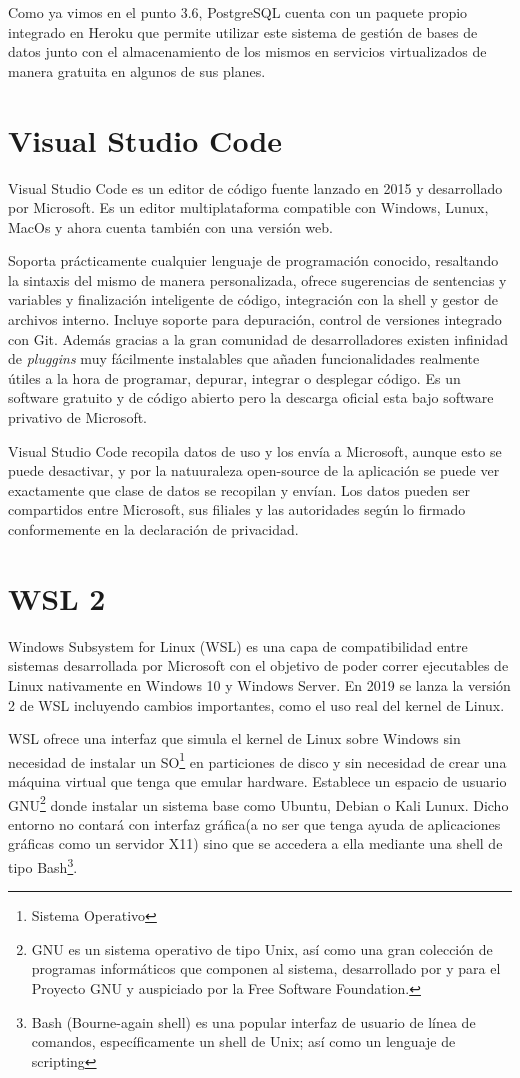 \documentclass[a4paper, 12pt]{book}
\begin{document}
Como ya vimos en el punto 3.6, PostgreSQL cuenta con un paquete propio integrado en Heroku que permite utilizar este sistema de gestión de bases de datos junto con el almacenamiento de los mismos en servicios virtualizados de manera gratuita en algunos de sus planes.  

\section{Visual Studio Code}
Visual Studio Code es un editor de código fuente lanzado en 2015 y desarrollado por Microsoft. Es un editor multiplataforma compatible con Windows, Lunux, MacOs y ahora cuenta también con una versión web. 

Soporta prácticamente cualquier lenguaje de programación conocido, resaltando la sintaxis del mismo de manera personalizada, ofrece sugerencias de sentencias y variables y finalización inteligente de código, integración con la shell y gestor de archivos interno. Incluye soporte para depuración, control de versiones integrado con Git. Además gracias a la gran comunidad de desarrolladores existen infinidad de \emph{pluggins} muy fácilmente instalables que añaden funcionalidades realmente útiles a la hora de programar, depurar, integrar o desplegar código. 
Es un software gratuito y de código abierto pero la descarga oficial esta bajo software privativo de Microsoft. 

Visual Studio Code recopila datos de uso y los envía a Microsoft, aunque esto se puede desactivar, y por la natuuraleza open-source de la aplicación se puede ver exactamente que clase de datos se recopilan y envían. Los datos pueden ser compartidos entre Microsoft, sus filiales y las autoridades según lo firmado conformemente en la declaración de privacidad. 

\section{WSL 2}
Windows Subsystem for Linux (WSL) es una capa de compatibilidad entre sistemas desarrollada por Microsoft con el objetivo de poder correr ejecutables de Linux nativamente en Windows 10 y Windows Server. En 2019 se lanza la versión 2 de WSL incluyendo cambios importantes, como el uso real del kernel de Linux. 

WSL ofrece una interfaz que simula el kernel de Linux sobre Windows sin necesidad de instalar un SO\footnote{Sistema Operativo} en particiones de disco y sin necesidad de crear una máquina virtual que tenga que emular hardware. Establece un espacio de usuario GNU\footnote{GNU es un sistema operativo de tipo Unix, así como una gran colección de programas informáticos que componen al sistema, desarrollado por y para el Proyecto GNU y auspiciado por la Free Software Foundation.} donde instalar un sistema base como Ubuntu, Debian o Kali Lunux. Dicho entorno no contará con interfaz gráfica(a no ser que tenga ayuda de aplicaciones gráficas como un servidor X11) sino que se accedera a ella mediante una shell de tipo Bash\footnote{Bash (Bourne-again shell) es una popular interfaz de usuario de línea de comandos, específicamente un shell de Unix; así como un lenguaje de scripting}. 
\end{document}
